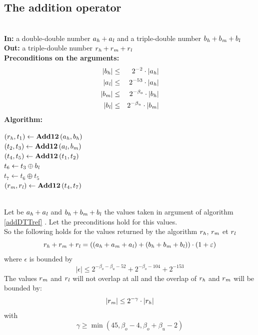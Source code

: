 \subsection{The addition operator \AddDTT}
\begin{algorithm}[\AddDTT] \label{addDTTref} ~ \\
{\bf In:} a double-double number $a_{\mathit{h}} + a_{\mathit{l}}$ and a triple-double number $b_{\mathit{h}} + b_{\mathit{m}} + b_{\mathit{l}}$ \\
{\bf Out:} a triple-double number $r_{\mathit{h}} + r_{\mathit{m}} + r_{\mathit{l}}$ \\
{\bf Preconditions on the arguments:}
\begin{eqnarray*}
\left \vert b_{\mathit{h}} \right \vert & \leq & 2^{-2} \cdot \left \vert a_{\mathit{h}} \right \vert \\
\left \vert a_{\mathit{l}} \right \vert & \leq & 2^{-53} \cdot \left \vert a_{\mathit{h}} \right \vert \\
\left \vert b_{\mathit{m}} \right \vert & \leq & 2^{-\beta_o} \cdot \left \vert b_{\mathit{h}} \right \vert \\
\left \vert b_{\mathit{l}} \right \vert & \leq & 2^{-\beta_u} \cdot \left \vert b_{\mathit{m}} \right \vert 
\end{eqnarray*}
{\bf Algorithm:} \\
\begin{center}
\begin{minipage}[b]{50mm}
$\left( r_{\mathit{h}}, t_1 \right) \gets \mathbf{Add12}\left( a_{\mathit{h}}, b_{\mathit{h}} \right)$ \\
$\left( t_2, t_3 \right) \gets \mathbf{Add12}\left( a_{\mathit{l}}, b_{\mathit{m}} \right)$ \\
$\left( t_4, t_5 \right) \gets \mathbf{Add12}\left( t_1, t_2 \right)$ \\
$t_6 \gets t_3 \oplus b_{\mathit{l}}$ \\
$t_7 \gets t_6 \oplus t_5$ \\
$\left( r_{\mathit{m}}, r_{\mathit{l}} \right) \gets \mathbf{Add12}\left( t_4, t_7 \right)$ \\
\end{minipage}
\end{center}
\end{algorithm}
\begin{theorem} ~ \\
Let be $a_{\mathit{h}} + a_{\mathit{l}}$ and $b_{\mathit{h}} + b_{\mathit{m}} + b_{\mathit{l}}$ the values taken in argument of algorithm \ref{addDTTref} \AddDTT. 
Let the preconditions hold for this values.\\
So the following holds for the values returned by the algorithm $r_{\mathit{h}}$, $r_{\mathit{m}}$ et $r_{\mathit{l}}$ 
$$r_{\mathit{h}} + r_{\mathit{m}} + r_{\mathit{l}} = \left(\left(a_{\mathit{h}} + a_{\mathit{m}} + a_{\mathit{l}} \right) + \left( b_{\mathit{h}} + b_{\mathit{m}} + b_{\mathit{l}} \right)\right) \cdot \left(1 + \varepsilon\right)$$
where $\epsilon$ is bounded by
$$\left \vert \epsilon \right \vert \leq 2^{-\beta_o - \beta_u - 52} + 2^{-\beta_o - 104} + 2^{-153}$$
The values $r_{\mathit{m}}$ and $r_{\mathit{l}}$ will not overlap at all and the overlap of $r_{\mathit{h}}$ and $r_{\mathit{m}}$ will be bounded by:
$$\left \vert r_{\mathit{m}} \right \vert \leq 2^{-\gamma} \cdot \left \vert r_{\mathit{h}} \right \vert$$
with
$$\gamma \geq \min\left( 45, \beta_o - 4, \beta_o + \beta_u - 2 \right)$$
\end{theorem}
